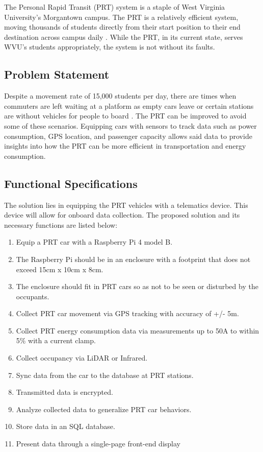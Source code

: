 The Personal Rapid Transit (PRT) system is a staple of West Virginia University’s Morgantown campus. The PRT is a relatively efficient system, moving thousands of students directly from their start position to their end destination across campus daily \cite{about-prt}. While the PRT, in its current state, serves WVU’s students appropriately, the system is not without its faults.

\subsection{Problem Statement}
Despite a movement rate of 15,000 students per day, there are times when commuters are left waiting at a platform as empty cars leave or certain stations are without vehicles for people to board \cite{about-prt}. The PRT can be improved to avoid some of these scenarios. Equipping cars with sensors to track data such as power consumption, GPS location, and passenger capacity allows said data to provide insights into how the PRT can be more efficient in transportation and energy consumption.
\subsection{Functional Specifications}
The solution lies in equipping the PRT vehicles with a telematics device. This device will allow for onboard data collection. The proposed solution and its necessary functions are listed below:
\begin{enumerate}
    \item Equip a PRT car with a Raspberry Pi 4 model B.
    \item The Raspberry Pi should be in an enclosure with a footprint that does not exceed 15cm x 10cm x 8cm.
    \item The enclosure should fit in PRT cars so as not to be seen or disturbed by the occupants.
    \item Collect PRT car movement via GPS tracking with accuracy of +/- 5m.
    \item Collect PRT energy consumption data via measurements up to 50A to within 5\% with a current clamp.
    \item Collect occupancy via LiDAR or Infrared.
    \item Sync data from the car to the database at PRT stations.
    \item Transmitted data is encrypted.
    \item Analyze collected data to generalize PRT car behaviors.
    \item Store data in an SQL database.
    \item Present data through a single-page front-end display
\end{enumerate}

